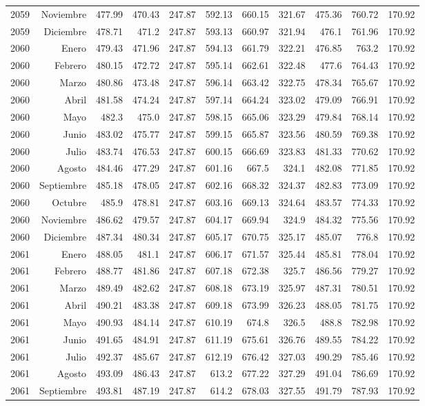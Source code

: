 \documentclass{article}%
\begin{document}
\begin{longtable}{|l r|r|r|r|r|r|r|r|r|r|}
2059&Noviembre&477.99&470.43&247.87&592.13&660.15&321.67&475.36&760.72&170.92\\%
2059&Diciembre&478.71&471.2&247.87&593.13&660.97&321.94&476.1&761.96&170.92\\%
2060&Enero&479.43&471.96&247.87&594.13&661.79&322.21&476.85&763.2&170.92\\%
2060&Febrero&480.15&472.72&247.87&595.14&662.61&322.48&477.6&764.43&170.92\\%
2060&Marzo&480.86&473.48&247.87&596.14&663.42&322.75&478.34&765.67&170.92\\%
2060&Abril&481.58&474.24&247.87&597.14&664.24&323.02&479.09&766.91&170.92\\%
2060&Mayo&482.3&475.0&247.87&598.15&665.06&323.29&479.84&768.14&170.92\\%
2060&Junio&483.02&475.77&247.87&599.15&665.87&323.56&480.59&769.38&170.92\\%
2060&Julio&483.74&476.53&247.87&600.15&666.69&323.83&481.33&770.62&170.92\\%
2060&Agosto&484.46&477.29&247.87&601.16&667.5&324.1&482.08&771.85&170.92\\%
2060&Septiembre&485.18&478.05&247.87&602.16&668.32&324.37&482.83&773.09&170.92\\%
2060&Octubre&485.9&478.81&247.87&603.16&669.13&324.64&483.57&774.33&170.92\\%
2060&Noviembre&486.62&479.57&247.87&604.17&669.94&324.9&484.32&775.56&170.92\\%
2060&Diciembre&487.34&480.34&247.87&605.17&670.75&325.17&485.07&776.8&170.92\\%
2061&Enero&488.05&481.1&247.87&606.17&671.57&325.44&485.81&778.04&170.92\\%
2061&Febrero&488.77&481.86&247.87&607.18&672.38&325.7&486.56&779.27&170.92\\%
2061&Marzo&489.49&482.62&247.87&608.18&673.19&325.97&487.31&780.51&170.92\\%
2061&Abril&490.21&483.38&247.87&609.18&673.99&326.23&488.05&781.75&170.92\\%
2061&Mayo&490.93&484.14&247.87&610.19&674.8&326.5&488.8&782.98&170.92\\%
2061&Junio&491.65&484.91&247.87&611.19&675.61&326.76&489.55&784.22&170.92\\%
2061&Julio&492.37&485.67&247.87&612.19&676.42&327.03&490.29&785.46&170.92\\%
2061&Agosto&493.09&486.43&247.87&613.2&677.22&327.29&491.04&786.69&170.92\\%
2061&Septiembre&493.81&487.19&247.87&614.2&678.03&327.55&491.79&787.93&170.92\\%

\end{longtable}
\end{document}
